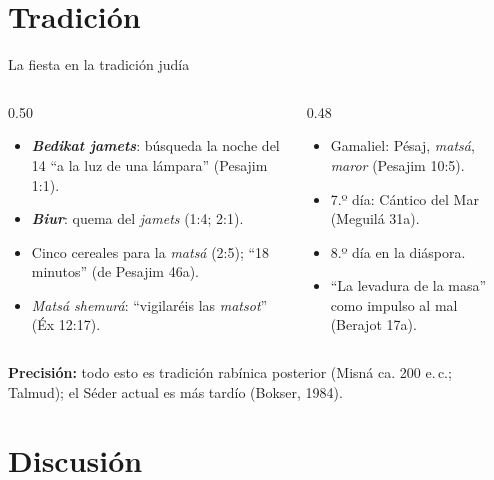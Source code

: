 \documentclass[hyperref={bookmarks=false},aspectratio=169]{beamer}
\newcommand{\destacar}[1]{\textbf{\textcolor{tierraroja}{#1}}}
\newcommand{\precision}[1]{{\footnotesize\color{sepia}\textbf{Precisión:} #1}}
\begin{document}
\section{Tradición}

\begin{frame}{La fiesta en la tradición judía}
\begin{columns}[t,onlytextwidth]
\begin{column}{0.50\textwidth}\scriptsize
\begin{itemize}
\item \destacar{\emph{Bedikat jamets}}: búsqueda la noche del 14 ``a la luz de una lámpara'' (Pesajim 1:1).
\item \destacar{\emph{Biur}}: quema del \emph{jamets} (1:4; 2:1).
\item Cinco cereales para la \emph{matsá} (2:5); ``18 minutos'' (de Pesajim 46a).
\item \emph{Matsá shemurá}: ``vigilaréis las \emph{matsot}'' (Éx 12:17).
\end{itemize}
\end{column}
\begin{column}{0.48\textwidth}\scriptsize
\begin{itemize}
\item Gamaliel: Pésaj, \emph{matsá}, \emph{maror} (Pesajim 10:5).
\item 7.º día: Cántico del Mar (Meguilá 31a).
\item 8.º día en la diáspora.
\item ``La levadura de la masa'' como impulso al mal (Berajot 17a).
\end{itemize}
\end{column}
\end{columns}\medskip
\precision{todo esto es tradición rabínica posterior (Misná ca. 200 e.\,c.; Talmud); el Séder actual es más tardío (Bokser, 1984).}
\end{frame}

\section{Discusión}
\end{document}
